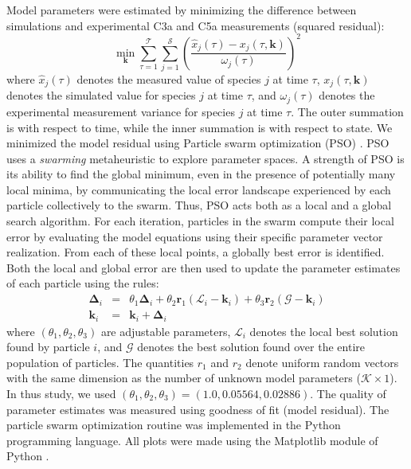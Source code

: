 \documentclass[12pt]{article}
\begin{document}
Model parameters were estimated by minimizing the difference between simulations and experimental C3a and C5a measurements (squared residual):
\begin{equation}\label{eqn:objective-function}
	\min_{\mathbf{k}} \sum_{\tau=1}^{\mathcal{T}}\sum_{j=1}^{\mathcal{S}}\left(\frac{\hat{x}_{j}\left(\tau\right) - x_{j}\left(\tau,\mathbf{k}\right)}{\omega_{j}\left(\tau\right)}\right)^{2}
\end{equation}where $\hat{x}_{j}\left(\tau\right)$ denotes the measured value of species $j$ at time $\tau$, $x_{j}\left(\tau,\mathbf{k}\right)$ denotes the simulated
value for species $j$ at time $\tau$, and $\omega_{j}\left(\tau\right)$ denotes the experimental measurement variance for species $j$ at time $\tau$. The outer summation is with respect to
time, while the inner summation is with respect to state. We minimized the model residual using Particle swarm optimization (PSO) \citep{PSO}.
PSO uses a \textit{swarming} metaheuristic to explore parameter spaces.
A strength of PSO is its ability to find the global minimum, even in the presence of potentially many local minima, by communicating the local
error landscape experienced by each particle collectively to the swarm. Thus, PSO acts both as a local and a global search algorithm.
For each iteration, particles in the swarm compute their local error by evaluating the model equations using their specific parameter vector realization.
From each of these local points, a globally best error is identified. Both the local and global error
are then used to update the parameter estimates of each particle using the rules:
\begin{eqnarray}
	\mathbf{\Delta}_{i} &=&\theta_{1}\mathbf{\Delta}_{i} + \theta_{2}\mathbf{r}_{1}\left(\mathcal{L}_{i} - \mathbf{k}_{i}\right) + \theta_{3}\mathbf{r}_{2}\left(\mathcal{G} - \mathbf{k}_{i}\right) \\
	\mathbf{k}_{i} &=& \mathbf{k}_{i} + \mathbf{\Delta}_{i}
\end{eqnarray}where $\left(\theta_{1},\theta_{2},\theta_{3}\right)$ are adjustable parameters, $\mathcal{L}_{i}$ denotes the local best solution found by particle $i$, and
$\mathcal{G}$ denotes the best solution found over the entire population of particles. The quantities $r_{1}$ and $r_{2}$ denote uniform random vectors with the same dimension as the number of unknown model
parameters \linebreak($\mathcal{K}\times{1}$). In thus study, we used $\left(\theta_{1},\theta_{2},\theta_{3}\right) = \left(1.0, 0.05564, 0.02886\right)$. The quality of parameter
estimates was measured using goodness of fit (model residual). The particle swarm optimization routine was implemented in the Python programming language.
All plots were made using the Matplotlib module of Python \citep{Matplotlib}.
\end{document}

